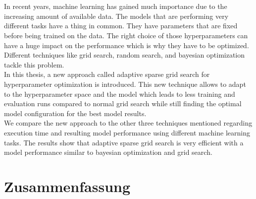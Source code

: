 \chapter{\abstractname}

In recent years, machine learning has gained much importance due to the increasing amount of available data. The models that are performing very different tasks have a thing in common. They have parameters that are fixed before being trained on the data. The right choice of those hyperparameters can have a huge impact on the performance which is why they have to be optimized. Different techniques like grid search, random search, and bayesian optimization tackle this problem. \\
In this thesis, a new approach called adaptive sparse grid search for hyperparameter optimization is introduced. This new technique allows to adapt to the hyperparameter space and the model which leads to less training and evaluation runs compared to normal grid search while still finding the optimal model configuration for the best model results. \\
We compare the new approach to the other three techniques mentioned regarding execution time and resulting model performance using different machine learning tasks. The results show that adaptive sparse grid search is very efficient with a model performance similar to bayesian optimization and grid search. 

\chapter*{Zusammenfassung} 
